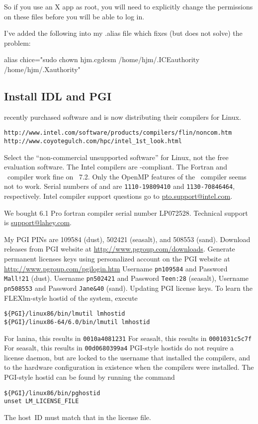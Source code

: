 \documentclass[12pt,twoside]{article}
\begin{document}
So if you use an X app as root, you will need to explicitly change the permissions on these files before you will be able to log in.

I've added the following into my .alias file which fixes (but does not solve) the problem:

alias chice="sudo chown hjm.cgdcsm /home/hjm/.ICEauthority /home/hjm/.Xauthority"


\subsection{Install IDL and PGI}\label{sxn:idl}
 recently purchased  software and is now
distributing their compilers for Linux.
\begin{verbatim}
http://www.intel.com/software/products/compilers/flin/noncom.htm
http://www.coyotegulch.com/hpc/intel_1st_look.html
\end{verbatim}
Select the ``non-commercial unsupported software'' for Linux, not the 
free evaluation software.
The Intel compilers are -compliant.
The Fortran and \cxx\ compiler work fine on ~7.2. 
Only the OpenMP features of the \cxx\ compiler seems not to work.
Serial numbers of  and  are
\verb'1110-19809410' and \verb'1130-70846464', respectively.
Intel compiler support questions go to \url{pto.support@intel.com}.

We bought  6.1 Pro fortran compiler serial number LP072528.
Technical support is \url{support@lahey.com}.

My PGI PINs are 109584 (dust), 502421 (seasalt), and 508553 (sand).
Download releases from PGI website at
\url{http://www.pgroup.com/downloads}.
Generate permanent licenses keys using personalized account on
the PGI website at \url{http://www.pgroup.com/pgilogin.htm}
Username \verb'pn109584' and Password \verb'Mall!21' (dust).
Username \verb'pn502421' and Password \verb'Teen:28' (seasalt),
Username \verb'pn508553' and Password \verb'Jane&40' (sand).
Updating PGI license keys. 
To learn the FLEXlm-style hostid of the system, execute
\begin{verbatim}
${PGI}/linux86/bin/lmutil lmhostid
${PGI}/linux86-64/6.0/bin/lmutil lmhostid
\end{verbatim}
For lanina, this results in \verb'0010a4081231'
For seasalt, this results in \verb'0001031c5c7f'
For seasalt, this results in \verb'00d0680399a4'
PGI-style hostids do not require a license daemon, but are locked to
the username that installed the compilers, and to the hardware
configuration in existence when the compilers were installed. 
The PGI-style hostid can be found by running the command 
\begin{verbatim}
${PGI}/linux86/bin/pghostid
unset LM_LICENSE_FILE
\end{verbatim}
The host~ID must match that in the license file.
\end{document}
